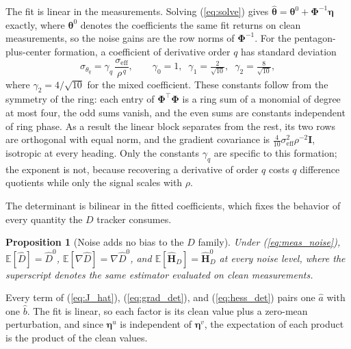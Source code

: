 \documentclass[lettersize,journal]{IEEEtran}
\newtheorem{proposition}{Proposition}
\begin{document}
The fit is linear in the measurements. Solving (\ref{eq:solve}) gives
$\hat{\boldsymbol{\theta}} = \boldsymbol{\theta}^0 +
\boldsymbol{\Phi}^{-1}\boldsymbol{\eta}$ exactly, where
$\boldsymbol{\theta}^0$ denotes the coefficients the same fit returns on
clean measurements, so the noise gains are the row norms of
$\boldsymbol{\Phi}^{-1}$. For the pentagon-plus-center formation, a
coefficient of derivative order $q$ has standard deviation
\begin{equation}
    \sigma_{\theta_q} = \gamma_q\,
    \frac{\sigma_{\mathrm{eff}}}{\rho^{\,q}},
    \qquad
    \gamma_0 = 1, \;\;
    \gamma_1 = \tfrac{2}{\sqrt{10}}, \;\;
    \gamma_2 = \tfrac{8}{\sqrt{10}},
    \label{eq:gain_ladder}
\end{equation}
where $\gamma_2 = 4/\sqrt{10}$ for the mixed coefficient. These
constants follow from the symmetry of the ring: each entry of
$\boldsymbol{\Phi}^\top\boldsymbol{\Phi}$ is a ring sum of a monomial of
degree at most four, the odd sums vanish, and the even sums are
constants independent of ring phase. As a result the linear block
separates from the rest, its two rows are orthogonal with equal norm,
and the gradient covariance is
$\tfrac{4}{10}\sigma_{\mathrm{eff}}^2\rho^{-2}\mathbf{I}$, isotropic at
every heading. Only the constants $\gamma_q$ are specific to this
formation; the exponent is not, because recovering a derivative of order
$q$ costs $q$ difference quotients while only the signal scales with
$\rho$.

The determinant is bilinear in the fitted coefficients, which fixes the
behavior of every quantity the $D$ tracker consumes.

\begin{proposition}[Noise adds no bias to the $D$ family]
\label{prop:unbiased}
Under (\ref{eq:meas_noise}), $\mathbb{E}[\hat{D}] = \hat{D}^{0}$,
$\mathbb{E}[\nabla\hat{D}] = \nabla\hat{D}^{0}$, and
$\mathbb{E}[\hat{\mathbf{H}}_D] = \hat{\mathbf{H}}_D^{0}$ at every noise
level, where the superscript denotes the same estimator evaluated on
clean measurements.
\end{proposition}

\begin{IEEEproof}
Every term of (\ref{eq:J_hat}), (\ref{eq:grad_det}), and
(\ref{eq:hess_det}) pairs one $\hat{a}$ with one $\hat{b}$. The fit is
linear, so each factor is its clean value plus a zero-mean perturbation,
and since $\boldsymbol{\eta}^u$ is independent of
$\boldsymbol{\eta}^v$, the expectation of each product is the product of
the clean values.
\end{IEEEproof}
\end{document}
